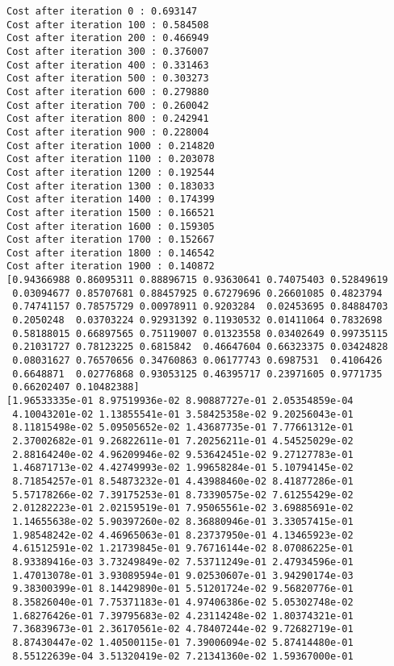 \documentclass[11pt]{article}
\begin{document}
    \begin{Verbatim}[commandchars=\\\{\}]
Cost after iteration 0 : 0.693147
Cost after iteration 100 : 0.584508
Cost after iteration 200 : 0.466949
Cost after iteration 300 : 0.376007
Cost after iteration 400 : 0.331463
Cost after iteration 500 : 0.303273
Cost after iteration 600 : 0.279880
Cost after iteration 700 : 0.260042
Cost after iteration 800 : 0.242941
Cost after iteration 900 : 0.228004
Cost after iteration 1000 : 0.214820
Cost after iteration 1100 : 0.203078
Cost after iteration 1200 : 0.192544
Cost after iteration 1300 : 0.183033
Cost after iteration 1400 : 0.174399
Cost after iteration 1500 : 0.166521
Cost after iteration 1600 : 0.159305
Cost after iteration 1700 : 0.152667
Cost after iteration 1800 : 0.146542
Cost after iteration 1900 : 0.140872
[0.94366988 0.86095311 0.88896715 0.93630641 0.74075403 0.52849619
 0.03094677 0.85707681 0.88457925 0.67279696 0.26601085 0.4823794
 0.74741157 0.78575729 0.00978911 0.9203284  0.02453695 0.84884703
 0.2050248  0.03703224 0.92931392 0.11930532 0.01411064 0.7832698
 0.58188015 0.66897565 0.75119007 0.01323558 0.03402649 0.99735115
 0.21031727 0.78123225 0.6815842  0.46647604 0.66323375 0.03424828
 0.08031627 0.76570656 0.34760863 0.06177743 0.6987531  0.4106426
 0.6648871  0.02776868 0.93053125 0.46395717 0.23971605 0.9771735
 0.66202407 0.10482388]
[1.96533335e-01 8.97519936e-02 8.90887727e-01 2.05354859e-04
 4.10043201e-02 1.13855541e-01 3.58425358e-02 9.20256043e-01
 8.11815498e-02 5.09505652e-02 1.43687735e-01 7.77661312e-01
 2.37002682e-01 9.26822611e-01 7.20256211e-01 4.54525029e-02
 2.88164240e-02 4.96209946e-02 9.53642451e-02 9.27127783e-01
 1.46871713e-02 4.42749993e-02 1.99658284e-01 5.10794145e-02
 8.71854257e-01 8.54873232e-01 4.43988460e-02 8.41877286e-01
 5.57178266e-02 7.39175253e-01 8.73390575e-02 7.61255429e-02
 2.01282223e-01 2.02159519e-01 7.95065561e-02 3.69885691e-02
 1.14655638e-02 5.90397260e-02 8.36880946e-01 3.33057415e-01
 1.98548242e-02 4.46965063e-01 8.23737950e-01 4.13465923e-02
 4.61512591e-02 1.21739845e-01 9.76716144e-02 8.07086225e-01
 8.93389416e-03 3.73249849e-02 7.53711249e-01 2.47934596e-01
 1.47013078e-01 3.93089594e-01 9.02530607e-01 3.94290174e-03
 9.38300399e-01 8.14429890e-01 5.51201724e-02 9.56820776e-01
 8.35826040e-01 7.75371183e-01 4.97406386e-02 5.05302748e-02
 1.68276426e-01 7.39795683e-02 4.23114248e-02 1.80374321e-01
 7.36839673e-01 2.36170561e-02 4.78407244e-02 9.72682719e-01
 8.87430447e-02 1.40500115e-01 7.39006094e-02 5.87414480e-01
 8.55122639e-04 3.51320419e-02 7.21341360e-02 1.59367000e-01

\end{Verbatim}
\end{document}
